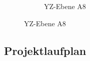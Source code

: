\begin{appendix}
\begin{landscape}
\begin{figure}[!ht]
\begin{subfigure}[t]{0.5\textwidth}
				\caption{YZ-Ebene A8}
	\end{subfigure}      
\end{figure}
\newpage
\end{landscape}
%
%
%
%

\begin{landscape}
	\section{Projektlaufplan}
	\label{sec:projectplan}
	\scalebox{.75}{
		
		}
\end{landscape}
%

\end{appendix}
